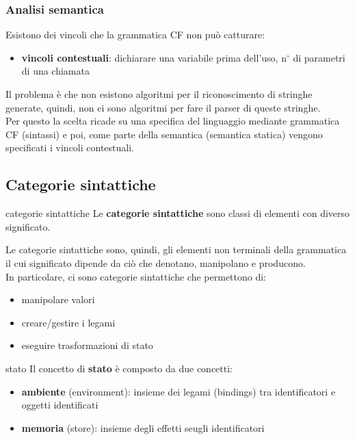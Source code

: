 \subsubsection{Analisi semantica}
Esistono dei vincoli che la grammatica CF non può catturare:
\begin{itemize}[label=$\triangleright$, itemsep=\smallskipamount]
    \item \textbf{vincoli contestuali}: dichiarare una variabile prima dell'uso, $\mathrm{n^\circ}$ di parametri di una chiamata
\end{itemize}

Il problema è che non esistono algoritmi per il riconoscimento di stringhe generate, quindi, non ci sono algoritmi per fare il parser di queste stringhe.\\[0.2ex]
Per questo la scelta ricade su una specifica del linguaggio mediante grammatica CF (sintassi) e poi, come parte della semantica (semantica statica) vengono specificati i vincoli contestuali.

\subsection{Categorie sintattiche}
\begin{mydef}{categorie sintattiche}
    Le \textbf{categorie sintattiche} sono classi di elementi con diverso significato.
\end{mydef}

Le categorie sintattiche sono, quindi, gli elementi non terminali della grammatica il cui significato dipende da ciò che denotano, manipolano e producono.\\[0.2ex]
In particolare, ci sono categorie sintattiche che permettono di:
\begin{itemize}[label=$\diamond$, itemsep=\smallskipamount]
    \item manipolare valori
    \item creare/gestire i legami
    \item eseguire trasformazioni di stato
\end{itemize}

\begin{mydef}{stato}
    Il concetto di \textbf{stato} è composto da due concetti:
    \begin{itemize}[label=$\triangleright$, itemsep=\smallskipamount]
        \item \textbf{ambiente} (environment): insieme dei legami (bindings) tra identificatori e oggetti identificati
        \item \textbf{memoria} (store): insieme degli effetti seugli identificatori
    \end{itemize}
\end{mydef}


